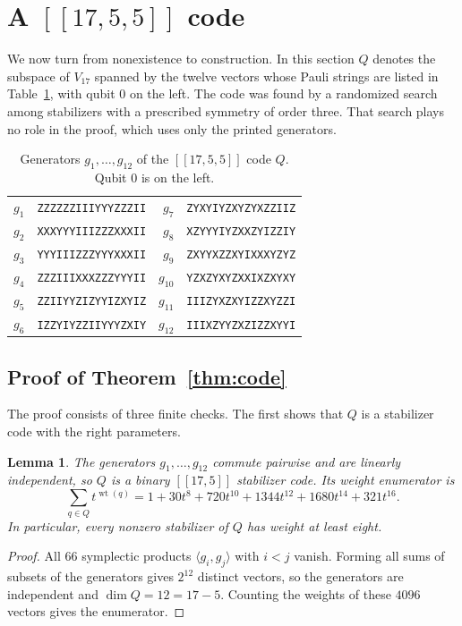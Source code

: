\documentclass[11pt]{article}
\newtheorem{lemma}[theorem]{Lemma}
\theoremstyle{definition}
\theoremstyle{remark}
\newcommand{\qc}[1]{[\![#1]\!]}
\newcommand{\wt}{\operatorname{wt}}
\begin{document}
\section{A \texorpdfstring{\(\qc{17,5,5}\)}{[[17,5,5]]} code}\label{sec:code}

We now turn from nonexistence to construction. In this section \(Q\)
denotes the subspace of \(V_{17}\) spanned by the twelve vectors whose
Pauli strings are listed in Table~\ref{tab:gens}, with qubit \(0\) on
the left. The code was found by a randomized search among stabilizers
with a prescribed symmetry of order three. That search plays no role in
the proof, which uses only the printed generators.

\begin{table}[htbp]
\centering\small
\caption{Generators \(g_1,\ldots,g_{12}\) of the \(\qc{17,5,5}\) code
\(Q\). Qubit \(0\) is on the left.}\label{tab:gens}
\begin{tabular}{@{}rl@{\qquad}rl@{}}\toprule
\(g_1\)&\texttt{ZZZZZZIIIYYYZZZII}&\(g_7\)&\texttt{ZYXYIYZXYZYXZZIIZ}\\
\(g_2\)&\texttt{XXXYYYIIIZZZXXXII}&\(g_8\)&\texttt{XZYYYIYZXXZYIZZIY}\\
\(g_3\)&\texttt{YYYIIIZZZYYYXXXII}&\(g_9\)&\texttt{ZXYYXZZXYIXXXYZYZ}\\
\(g_4\)&\texttt{ZZZIIIXXXZZZYYYII}&\(g_{10}\)&\texttt{YZXZYXYZXXIXZXYXY}\\
\(g_5\)&\texttt{ZZIIYYZIZYYIZXYIZ}&\(g_{11}\)&\texttt{IIIZYXZXYIZZXYZZI}\\
\(g_6\)&\texttt{IZZYIYZZIIYYYZXIY}&\(g_{12}\)&\texttt{IIIXZYYZXZIZZXYYI}\\\bottomrule
\end{tabular}
\end{table}

\subsection{Proof of Theorem~\ref{thm:code}}

The proof consists of three finite checks. The first shows that \(Q\)
is a stabilizer code with the right parameters.

\begin{lemma}\label{lem:Qrank}
The generators \(g_1,\ldots,g_{12}\) commute pairwise and are linearly
independent, so \(Q\) is a binary \(\qc{17,5}\) stabilizer code. Its
weight enumerator is
\[
 \sum_{q\in Q}t^{\wt(q)}=1+30t^{8}+720t^{10}+1344t^{12}+1680t^{14}+321t^{16}.
\]
In particular, every nonzero stabilizer of \(Q\) has weight at least
eight.
\end{lemma}
\begin{proof}
All \(66\) symplectic products \(\langle g_i,g_j\rangle\) with \(i<j\)
vanish. Forming all sums of subsets of the generators gives \(2^{12}\)
distinct vectors, so the generators are independent and
\(\dim Q=12=17-5\). Counting the weights of these \(4096\) vectors gives
the enumerator.
\end{proof}
\end{document}
